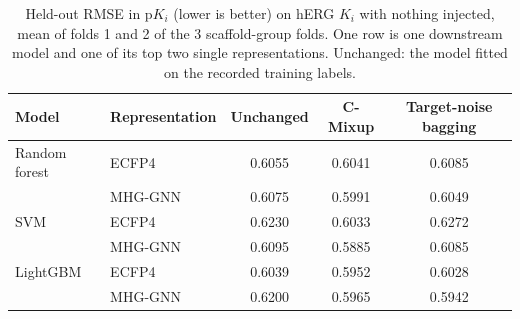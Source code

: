 \begin{table}[htbp]
\centering
\small
\begin{tabular}{@{}llccc@{}}
\toprule
Model & Representation & Unchanged & C-Mixup & Target-noise bagging \\
\midrule
Random forest & ECFP4 & 0.6055 & 0.6041 & 0.6085 \\
 & MHG-GNN & 0.6075 & 0.5991 & 0.6049 \\
\addlinespace
SVM & ECFP4 & 0.6230 & 0.6033 & 0.6272 \\
 & MHG-GNN & 0.6095 & 0.5885 & 0.6085 \\
\addlinespace
LightGBM & ECFP4 & 0.6039 & 0.5952 & 0.6028 \\
 & MHG-GNN & 0.6200 & 0.5965 & 0.5942 \\
\bottomrule
\end{tabular}
\caption[C-Mixup and target-noise bagging on the recorded hERG $K_i$ labels]{Held-out RMSE in p$K_i$ (lower is better) on hERG $K_i$ with nothing injected, mean of folds 1 and 2 of the 3 scaffold-group folds. One row is one downstream model and one of its top two single representations. Unchanged: the model fitted on the recorded training labels.}
\label{tab:ch6prelim_level0_mixup}
\end{table}

